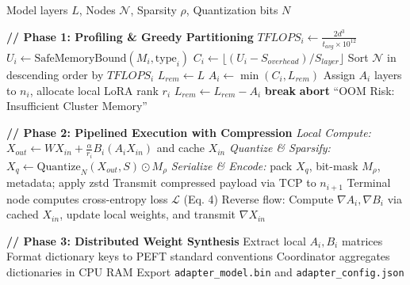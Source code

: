 \documentclass{ieeeaccess}
\begin{document}
\begin{algorithm}[t]
\caption{LoraLink: Hardware-Aware Partitioning and Execution}
\small
\begin{algorithmic}[1]
\renewcommand{\algorithmicrequire}{\textbf{Input:}}
\REQUIRE Model layers $L$, Nodes $\mathcal{N}$, Sparsity $\rho$, Quantization bits $N$
\vspace{0.15cm}

\STATE \textbf{// Phase 1: Profiling \& Greedy Partitioning}
    \STATE $TFLOPS_i \gets \frac{2d^3}{t_{avg} \times 10^{12}}$ 
    \STATE $U_i \gets \text{SafeMemoryBound}(M_i, \text{type}_i)$ 
    \STATE $C_i \gets \lfloor (U_i - S_{overhead}) / S_{layer} \rfloor$ 
\ENDFOR
\STATE Sort $\mathcal{N}$ in descending order by $TFLOPS_i$
\STATE $L_{rem} \gets L$ 
    \STATE $A_i \gets \min(C_i, L_{rem})$ 
    \STATE Assign $A_i$ layers to $n_i$, allocate local LoRA rank $r_i$
    \STATE $L_{rem} \gets L_{rem} - A_i$
        \STATE \textbf{break}
    \ENDIF
\ENDFOR
{}
    \STATE \textbf{abort} ``OOM Risk: Insufficient Cluster Memory''
\ENDIF
\vspace{0.15cm}

\STATE \textbf{// Phase 2: Pipelined Execution with Compression}
        \STATE \textit{Local Compute:} $X_{out} \gets WX_{in} + \frac{\alpha}{r_i}B_i(A_i X_{in})$ and cache $X_{in}$
        \STATE \textit{Quantize \& Sparsify:} $X_q \gets \text{Quantize}_N(X_{out}, S) \odot M_{\rho}$
        \STATE \textit{Serialize \& Encode:} pack $X_q$, bit-mask $M_{\rho}$, metadata; apply zstd
        \STATE Transmit compressed payload via TCP to $n_{i+1}$
    \ENDFOR
    \STATE Terminal node computes cross-entropy loss $\mathcal{L}$ (Eq. 4)
    \STATE Reverse flow: Compute $\nabla A_i, \nabla B_i$ via cached $X_{in}$, update local weights, and transmit $\nabla X_{in}$
\ENDWHILE
\vspace{0.15cm}

\STATE \textbf{// Phase 3: Distributed Weight Synthesis}
    \STATE Extract local $A_i, B_i$ matrices
    \STATE Format dictionary keys to PEFT standard conventions
\ENDFOR
\STATE Coordinator aggregates dictionaries in CPU RAM
\STATE Export \texttt{adapter\_model.bin} and \texttt{adapter\_config.json}
\end{algorithmic}
\end{algorithm}
\end{document}
